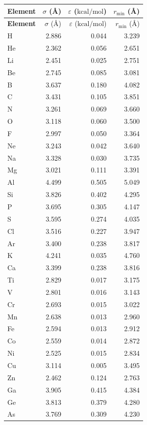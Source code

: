 \documentclass[11pt,twoside]{article}
\newcommand{\kcalmol}{\text{kcal/mol}}
\newcommand{\rmin}{r_{\mathrm{min}}}
\begin{document}
\begin{longtable}{lrrr}
\toprule
\textbf{Element} & $\sigma$ (\AA) & $\varepsilon$ ($\kcalmol$) & $\rmin$ (\AA) \\
\midrule
\endfirsthead
\toprule
\textbf{Element} & $\sigma$ (\AA) & $\varepsilon$ ($\kcalmol$) & $\rmin$ (\AA) \\
\midrule
\endhead
H  & 2.886 & 0.044 & 3.239 \\
He & 2.362 & 0.056 & 2.651 \\
Li & 2.451 & 0.025 & 2.751 \\
Be & 2.745 & 0.085 & 3.081 \\
B  & 3.637 & 0.180 & 4.082 \\
C  & 3.431 & 0.105 & 3.851 \\
N  & 3.261 & 0.069 & 3.660 \\
O  & 3.118 & 0.060 & 3.500 \\
F  & 2.997 & 0.050 & 3.364 \\
Ne & 3.243 & 0.042 & 3.640 \\
Na & 3.328 & 0.030 & 3.735 \\
Mg & 3.021 & 0.111 & 3.391 \\
Al & 4.499 & 0.505 & 5.049 \\
Si & 3.826 & 0.402 & 4.295 \\
P  & 3.695 & 0.305 & 4.147 \\
S  & 3.595 & 0.274 & 4.035 \\
Cl & 3.516 & 0.227 & 3.947 \\
Ar & 3.400 & 0.238 & 3.817 \\
K  & 4.241 & 0.035 & 4.760 \\
Ca & 3.399 & 0.238 & 3.816 \\
Ti & 2.829 & 0.017 & 3.175 \\
V  & 2.801 & 0.016 & 3.143 \\
Cr & 2.693 & 0.015 & 3.022 \\
Mn & 2.638 & 0.013 & 2.960 \\
Fe & 2.594 & 0.013 & 2.912 \\
Co & 2.559 & 0.014 & 2.872 \\
Ni & 2.525 & 0.015 & 2.834 \\
Cu & 3.114 & 0.005 & 3.495 \\
Zn & 2.462 & 0.124 & 2.763 \\
Ga & 3.905 & 0.415 & 4.384 \\
Ge & 3.813 & 0.379 & 4.280 \\
As & 3.769 & 0.309 & 4.230 \\

\end{longtable}
\end{document}
